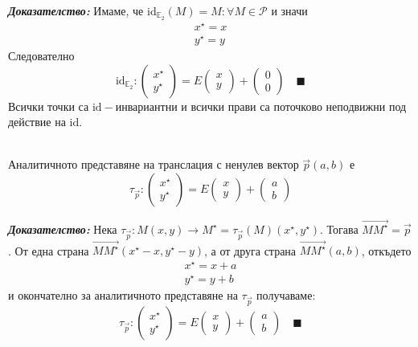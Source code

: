 \documentclass[12pt]{article}
\begin{document}
\textbf{\textit{Доказателство:}} Имаме, че $\mathrm{id}_{\mathbb E_2}(M)=M:\forall M\in\mathcal P$ и значи $$\begin{array}{|l} x^\star=x \\ y^\star=y\end{array}$$ Следователно $$\mathrm{id}_{\mathbb E_2}:\begin{pmatrix} x^\star \\ y^{\star}\end{pmatrix}=E\begin{pmatrix} x \\ y\end{pmatrix}+\begin{pmatrix} 0 \\ 0\end{pmatrix}\quad \blacksquare$$
Всички точки са $\mathrm{id}-$инвариантни и всички прави са поточково неподвижни под действие на $\mathrm{id}$.
\\
\\
\begin{tcolorbox}[
    colback=blue!5,    %
    colframe=blue!75!black, %
    title={\textbf{Твърдение 16:}}, %
    fonttitle=\bfseries,
    boxrule=0.8pt,
    arc=1mm,           %
    top=2mm, bottom=2mm, left=3mm, right=3mm
]  Аналитичното представяне на транслация с ненулев вектор $\vec{p}(a,b)$ е $$\tau_{\vec{p}}:\begin{pmatrix} x^\star \\ y^{\star}\end{pmatrix}=E\begin{pmatrix} x \\ y\end{pmatrix}+\begin{pmatrix} a \\ b\end{pmatrix}$$
\end{tcolorbox}
\textbf{\textit{Доказателство:}} Нека $\tau_{\vec{p}}:M(x,y)\to M^\star=\tau_{\vec{p}}(M)(x^\star,y^\star)$. Тогава $\overrightarrow{MM^\star}=\vec{p}$. От една страна $\overrightarrow{MM^\star}(x^\star-x,y^\star-y)$, а от друга страна $\overrightarrow{MM^\star}(a,b)$, откъдето $$\begin{array}{|l} x^\star=x+a \\ y^\star=y+b\end{array}$$ и окончателно за аналитичното представяне на $\tau_{\vec{p}}$ получаваме: $$\tau_{\vec{p}}:\begin{pmatrix} x^\star \\ y^{\star}\end{pmatrix}=E\begin{pmatrix} x \\ y\end{pmatrix}+\begin{pmatrix} a \\ b\end{pmatrix}\quad \blacksquare$$
\end{document}
